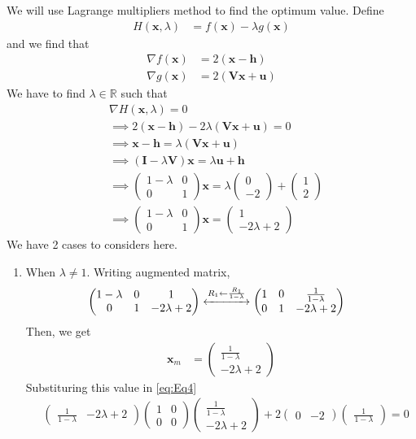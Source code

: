 \documentclass[12pt]{article}
\providecommand{\brak}[1]{\ensuremath{\left(#1\right)}}
\newcommand{\myvec}[1]{\ensuremath{\begin{pmatrix}#1\end{pmatrix}}}
\let\vec\mathbf
\begin{document}
\begin{enumerate}
We will use Lagrange multipliers method to find the optimum value. Define
\begin{align}
	H\brak{\vec{x}, \lambda} &= f\brak{\vec{x}} - \lambda g\brak{\vec{x}} 
\end{align}
and we find that 
\begin{align}
	\nabla f\brak{\vec{x}} &= 2\brak{\vec{x}-\vec{h}} \\
	\nabla g\brak{\vec{x}} &= 2\brak{\vec{V}\vec{x}+\vec{u}}
\end{align}
We have to find $\lambda \in \mathbb{R}$ such that
\begin{align}
	&\nabla H\brak{\vec{x},\lambda} = 0 \\
        \label{eq:Eqlambda}
	&\implies 2\brak{\vec{x}-\vec{h}} - 2\lambda\brak{\vec{V}\vec{x}+\vec{u}} = 0 \\
        \label{eq:Eqx}
	&\implies \vec{x} - \vec{h} =  \lambda\brak{\vec{V}\vec{x}+\vec{u}}   \\
	&\implies \brak{\vec{I} - \lambda\vec{V}}\vec{x} =  \lambda\vec{u}+\vec{h} \\ 
	&\implies \myvec{1-\lambda & 0 \\ 0 & 1}\vec{x} = \lambda\myvec{0 \\ -2} + \myvec{1 \\2} \\ 
        \label{eq:EqL}
	&\implies \myvec{1-\lambda & 0 \\ 0 & 1}\vec{x} = \myvec{1 \\ -2\lambda+2}  
\end{align}
We have 2 cases to considers here.
\begin{enumerate}
\item When $\lambda \ne 1$. Writing augmented matrix,
\begin{align}
	&\myvec{1-\lambda & 0 & 1\\ 0 & 1 & -2\lambda+2} \xleftrightarrow[]{R_1 \leftarrow \frac{R_1}{1-\lambda}} \myvec{1&0&\frac{1}{1-\lambda}\\0&1&-2\lambda+2}
\end{align}
Then, we get
\begin{align}
        \label{eq:Eqxm}
	\vec{x}_{m} &= \myvec{ \frac{1}{1-\lambda} \\ -2\lambda+2}
\end{align}
Substituring this value in \eqref{eq:Eq4}
\begin{align}
	&\myvec{\frac{1}{1-\lambda} & -2\lambda+2}\myvec{1 & 0 \\ 0 & 0}\myvec{\frac{1}{1-\lambda} \\ -2\lambda+2} + 2\myvec{0 & -2}\myvec{\frac{1}{1-\lambda}} = 0 \\ 

\end{align}
\end{enumerate}
\end{enumerate}
\end{document}

